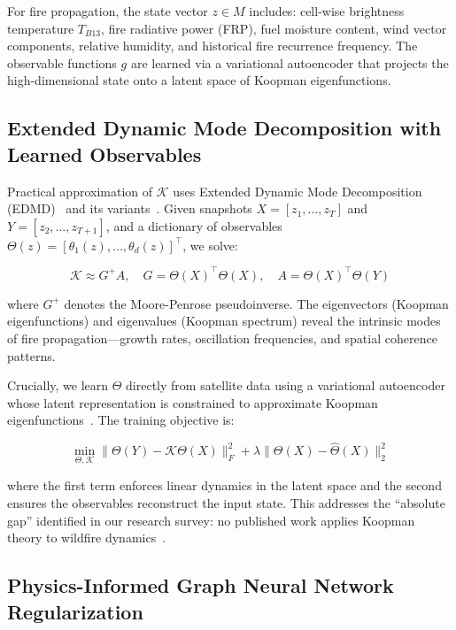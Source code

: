 \documentclass[11pt,twocolumn,a4paper]{article}
\newcommand{\abbrev}[1]{{\small\textsc{#1}}}
\newcommand{\sK}{\mathcal{K}}
\begin{document}
For fire propagation, the state vector $z \in M$ includes: cell-wise brightness temperature $T_{B13}$, fire radiative power (\abbrev{FRP}), fuel moisture content, wind vector components, relative humidity, and historical fire recurrence frequency. The observable functions $g$ are learned via a variational autoencoder that projects the high-dimensional state onto a latent space of Koopman eigenfunctions.

\subsection{Extended Dynamic Mode Decomposition with Learned Observables}

Practical approximation of $\sK$ uses Extended Dynamic Mode Decomposition (\abbrev{EDMD})~\cite{williams2015} and its variants~\cite{proctor2016,baddoo2023}. Given snapshots $X = [z_1, \ldots, z_T]$ and $Y = [z_2, \ldots, z_{T+1}]$, and a dictionary of observables $\Theta(z) = [\theta_1(z), \ldots, \theta_d(z)]^\top$, we solve:

\begin{equation}
\sK \approx G^{+} A, \quad G = \Theta(X)^\top \Theta(X), \quad A = \Theta(X)^\top \Theta(Y)
\label{eq:edmd}
\end{equation}

where $G^{+}$ denotes the Moore-Penrose pseudoinverse. The eigenvectors (Koopman eigenfunctions) and eigenvalues (Koopman spectrum) reveal the intrinsic modes of fire propagation---growth rates, oscillation frequencies, and spatial coherence patterns.

Crucially, we learn $\Theta$ directly from satellite data using a variational autoencoder whose latent representation is constrained to approximate Koopman eigenfunctions~\cite{lusch2018,takeishi2017}. The training objective is:

\begin{equation}
\min_{\Theta, \sK} \| \Theta(Y) - \sK \Theta(X) \|_F^2 + \lambda \| \Theta(X) - \hat{\Theta}(X) \|_2^2
\label{eq:vae_koopman}
\end{equation}

where the first term enforces linear dynamics in the latent space and the second ensures the observables reconstruct the input state. This addresses the ``absolute gap'' identified in our research survey: no published work applies Koopman theory to wildfire dynamics~\cite{brunton2021}.

\subsection{Physics-Informed Graph Neural Network Regularization}
\end{document}
